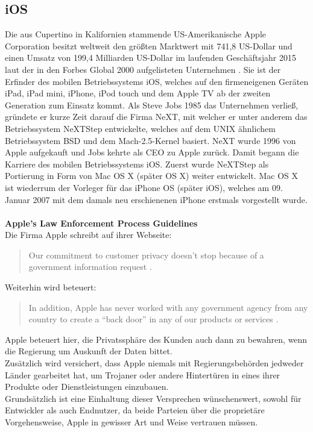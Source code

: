 \subsection{iOS}
	Die aus Cupertino in Kalifornien stammende US-Amerikanische Apple Corporation
	besitzt weltweit den größten Marktwert mit 741,8 US-Dollar und einen
	Umsatz von 199,4 Milliarden US-Dollar im laufenden Geschäftsjahr 2015 laut der
	in den Forbes Global 2000 aufgelisteten Unternehmen \cite{FORBES2000}.
	Sie ist der Erfinder des mobilen Betriebssystems iOS, welches auf den firmeneigenen Geräten iPad, iPad mini,
	iPhone, iPod touch und dem Apple TV ab der zweiten Generation zum Einsatz
	kommt. Als Steve Jobs 1985 das Unternehmen verließ, gründete er
	kurze Zeit darauf die Firma NeXT, mit welcher er unter anderem das
	Betriebssystem NeXTStep entwickelte, welches auf dem UNIX ähnlichem
	Betriebssystem BSD \cite[S.12]{Tanenbaum2009} und dem
	Mach-2.5-Kernel \cite{MachProject2015} basiert. NeXT wurde 1996 von Apple
	aufgekauft und Jobs kehrte als CEO zu Apple zurück. Damit begann die Karriere
	des mobilen Betriebssystems iOS. Zuerst wurde NeXTStep als Portierung in Form
	von Mac OS X (später OS X) weiter entwickelt. Mac OS X ist wiederrum der
	Vorleger für das iPhone OS (später iOS), welches am 09. Januar 2007 mit dem
	damals neu erschienenen iPhone erstmals vorgestellt wurde.
	\\\\
	\textbf{Apple's Law Enforcement Process Guidelines}
	\\
	Die Firma Apple schreibt auf ihrer Webseite:
	\begin{quote}
		Our commitment to customer privacy doesn't stop because of a government
		information request \cite{AppleGovInfo2015}.
	\end{quote}
	Weiterhin wird beteuert:
	\begin{quote}
		In addition, Apple has never worked with any government agency from any
		country to create a "`back door"' in any of our products or
		services \cite{AppleGovInfo2015}.
	\end{quote}
	Apple beteuert hier, die Privatssphäre des Kunden auch dann zu bewahren,
	wenn die Regierung um Auskunft der Daten bittet.\\
	Zusätzlich wird versichert, dass Apple niemals mit Regierungsbehörden
	jedweder Länder gearbeitet hat, um Trojaner oder andere Hintertüren in eines
	ihrer Produkte oder Dienstleistungen einzubauen.\\
	Grundsätzlich ist eine Einhaltung dieser Versprechen wünschenswert, sowohl für
	Entwickler als auch Endnutzer, da beide Parteien über die proprietäre
	Vorgehensweise, Apple in gewisser Art und Weise vertrauen müssen.
